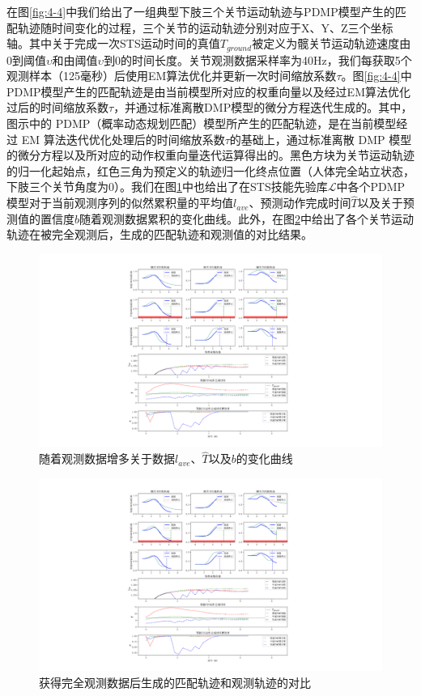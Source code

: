在图\ref{fig:4-4}中我们给出了一组典型下肢三个关节运动轨迹与PDMP模型产生的匹配轨迹随时间变化的过程，三个关节的运动轨迹分别对应于X、Y、Z三个坐标轴。其中关于完成一次STS运动时间的真值$T_{ground}$被定义为髋关节运动轨迹速度由0到阈值$\upsilon $和由阈值$\upsilon$到0的时间长度。关节观测数据采样率为40Hz，我们每获取5个观测样本（125毫秒）后使用EM算法优化并更新一次时间缩放系数$\tau$。图\ref{fig:4-4}中PDMP模型产生的匹配轨迹是由当前模型所对应的权重向量以及经过EM算法优化过后的时间缩放系数$\tau$，并通过标准离散DMP模型的微分方程迭代生成的。其中，图示中的 PDMP（概率动态规划匹配）模型所产生的匹配轨迹，是在当前模型经过 EM 算法迭代优化处理后的时间缩放系数$\tau$的基础上，通过标准离散 DMP 模型的微分方程以及所对应的动作权重向量迭代运算得出的。黑色方块为关节运动轨迹的归一化起始点，红色三角为预定义的轨迹归一化终点位置（人体完全站立状态，下肢三个关节角度为0）。我们在图\ref{fig:4-5}中也给出了在STS技能先验库$\mathscr{L}$中各个PDMP模型对于当前观测序列的似然累积量的平均值$l_{ave}$、预测动作完成时间$\hat T$以及关于预测值的置信度$b$随着观测数据累积的变化曲线。此外，在图\ref{fig:4-6}中给出了各个关节运动轨迹在被完全观测后，生成的匹配轨迹和观测值的对比结果。
\begin{figure}[htb]
    \centering\includegraphics[width=1\textwidth]{figures/4-Fig-5.pdf}
    \caption{随着观测数据增多关于数据$l_{ave}$、$\hat T$以及$b$的变化曲线}
    \label{fig:4-5}
\end{figure}

\begin{figure}[htb]
    \centering\includegraphics[width=1\textwidth]{figures/4-Fig-6.pdf}
    \caption{获得完全观测数据后生成的匹配轨迹和观测轨迹的对比}
    \label{fig:4-6}
\end{figure}

